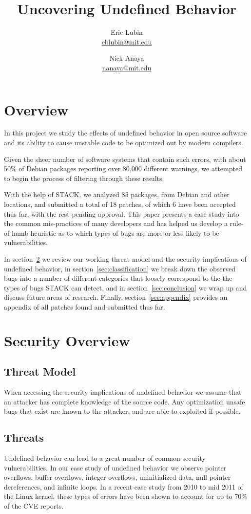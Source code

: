 \documentclass[9pt,twocolumn]{article}
\title{Uncovering Undefined Behavior}
\author{
    Eric Lubin\\
    \href{mailto:eblubin@mit.edu}{eblubin@mit.edu}
\and
    Nick Anaya\\
    \href{mailto:nanaya@mit.edu}{nanaya@mit.edu}
}
\newcommand{\NumPackages}{85 }
\newcommand{\NumPatches}{18 }
\newcommand{\NumPatchesAccepted}{6 }
\begin{document}
\maketitle

\section{Overview}
In this project we study the effects of undefined behavior in open source software
and its ability to cause unstable code to be optimized out by modern compilers.

Given the sheer number of software systems that contain such errors, 
with about 50\% of Debian packages reporting over 80,000 different warnings,
we attempted to begin the process of filtering through these results. 

With the help of STACK\cite{stack}, we analyzed \NumPackages packages, 
from Debian and other locations, and submitted a total of \NumPatches patches, 
of which \NumPatchesAccepted have been accepted thus far, with the rest pending approval.
This paper presents a case study into the common mis-practices of many developers and
has helped us develop a rule-of-humb heuristic as to which types of bugs are more
or less likely to be vulnerabilities.

In section~\ref{sec:security} we review our working threat model and the
security implications of undefined behavior, in
section~\ref{sec:classification} we break down the observed bugs into a number
of different categories that loosely correspond to the the types of bugs STACK
can detect, and in section~\ref{sec:conclusion} we wrap up and discuss future
areas of research. Finally, section~\ref{sec:appendix} provides an appendix of
all patches found and submitted thus far.

\section{Security Overview}
\label{sec:security}
\subsection{Threat Model}
When accessing the security implications of undefined behavior we assume that
an attacker has complete knowledge of the source code. Any optimization unsafe
bugs that exist are known to the attacker, and are able to exploited if
possible.

\subsection{Threats}
Undefined behavior can lead to a great number of common security
vulnerabilities. In our case study of undefined behavior we observe pointer
overflows, buffer overflows, integer overflows, uninitialized data, null
pointer dereferences, and infinite loops. In a recent case study from 2010 to
mid 2011 \cite{chen-kbugs} of the Linux kernel, these types of errors have been
shown to account for up to 70\% of the CVE reports.
\end{document}
